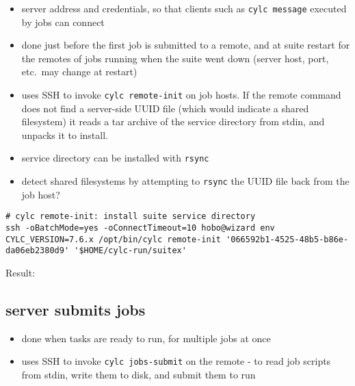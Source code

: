 \documentclass{article}
\begin{document}
\begin{itemize}
  \item server address and credentials, so that clients such as
    \lstinline=cylc message=  executed by jobs can connect
  \item done just before the first job is submitted to a remote, and at
    suite restart for the remotes of jobs running when the suite went
    down (server host, port, etc.\ may change at restart)
  \item uses SSH to invoke \lstinline=cylc remote-init= on 
    job hosts. If the remote command does not find a server-side UUID file
    (which would indicate a shared filesystem) it reads a tar archive of
    the service directory from stdin, and unpacks it to install.
\end{itemize}

{\color{blue}{\bf SSH-free?}
\begin{itemize}
  \item service directory can be installed with \lstinline=rsync=
  \item detect shared filesystems by attempting to \lstinline=rsync= the UUID
    file back from the job host?
\end{itemize}
}

\lstset{language=jobhosts}

\vspace{5mm}
\begin{lstlisting}
# cylc remote-init: install suite service directory
ssh -oBatchMode=yes -oConnectTimeout=10 hobo@wizard env CYLC_VERSION=7.6.x /opt/bin/cylc remote-init '066592b1-4525-48b5-b86e-da06eb2380d9' '$HOME/cylc-run/suitex'
\end{lstlisting}

Result:
{\scriptsize
{}
}

\subsection{server submits jobs}
\begin{itemize}
  \item done when tasks are ready to run, for multiple jobs at once
  \item uses SSH to invoke \lstinline=cylc jobs-submit= on the
    remote - to read job scripts from stdin, write them to disk, and submit
    them to run
\end{itemize}
\end{document}
